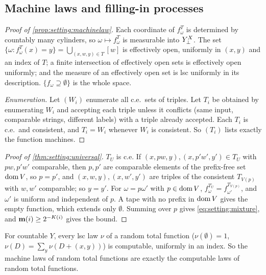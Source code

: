 \subsection{Machine laws and filling-in processes}\label{app:setting:machines}

\begin{proof}[Proof of \cref{prop:setting:machinelaw}]
Each coordinate of $f^T_\omega$ is determined by countably many cylinders, so $\omega\mapsto f^T_\omega$ is measurable into $Y_{\bot}^X$. The set $\{\omega:f^T_\omega(x)=y\}=\bigcup_{(x,w,y)\in T}[w]$ is effectively open, uniformly in $(x,y)$ and an index of $T$; a finite intersection of effectively open sets is effectively open uniformly; and the measure of an effectively open set is lsc uniformly in its description. $\{f_\omega\supseteq\emptyset\}$ is the whole space.

\emph{Enumeration.} Let $(W_i)$ enumerate all c.e.\ sets of triples. Let $T_i$ be obtained by enumerating $W_i$ and accepting each triple unless it conflicts (same input, comparable strings, different labels) with a triple already accepted. Each $T_i$ is c.e.\ and consistent, and $T_i=W_i$ whenever $W_i$ is consistent. So $(T_i)$ lists exactly the function machines.
\end{proof}

\begin{proof}[Proof of \cref{thm:setting:universal}]
$T_U$ is c.e. If $(x,pw,y),(x,p'w',y')\in T_U$ with $pw,p'w'$ comparable, then $p,p'$ are comparable elements of the prefix-free set $\operatorname{dom} V$, so $p=p'$, and $(x,w,y),(x,w',y')$ are triples of the consistent $T_{V(p)}$ with $w,w'$ comparable; so $y=y'$. For $\omega=p\omega'$ with $p\in\operatorname{dom} V$, $f^{T_U}_\omega=f^{T_{V(p)}}_{\omega'}$, and $\omega'$ is uniform and independent of $p$. A tape with no prefix in $\operatorname{dom} V$ gives the empty function, which extends only $\emptyset$. Summing over $p$ gives \eqref{eq:setting:mixture}, and $\mathbf{m}(i)\ge2^{-K(i)}$ gives the bound.
\end{proof}

\begin{lemma}\label{lem:setting:total}
For countable $Y$, every lsc law $\nu$ of a random total function ($\nu(\emptyset)=1$, $\nu(D)=\sum_y\nu(D+(x,y))$) is computable, uniformly in an index. So the machine laws of random total functions are exactly the computable laws of random total functions.
\end{lemma}

